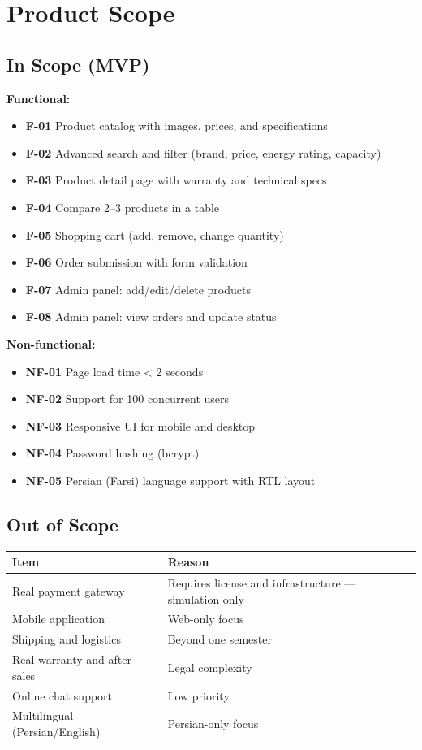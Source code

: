 \documentclass[12pt, a4paper]{article}
\begin{document}
\section{Product Scope}

\subsection{In Scope (MVP)}

\textbf{Functional:}
\begin{itemize}
    \item \textbf{F-01} Product catalog with images, prices, and specifications
    \item \textbf{F-02} Advanced search and filter (brand, price, energy rating, capacity)
    \item \textbf{F-03} Product detail page with warranty and technical specs
    \item \textbf{F-04} Compare 2--3 products in a table
    \item \textbf{F-05} Shopping cart (add, remove, change quantity)
    \item \textbf{F-06} Order submission with form validation
    \item \textbf{F-07} Admin panel: add/edit/delete products
    \item \textbf{F-08} Admin panel: view orders and update status
\end{itemize}

\textbf{Non-functional:}
\begin{itemize}
    \item \textbf{NF-01} Page load time < 2 seconds
    \item \textbf{NF-02} Support for 100 concurrent users
    \item \textbf{NF-03} Responsive UI for mobile and desktop
    \item \textbf{NF-04} Password hashing (bcrypt)
    \item \textbf{NF-05} Persian (Farsi) language support with RTL layout
\end{itemize}

\subsection{Out of Scope}
\begin{center}
\begin{tabular}{|l|p{8cm}|}
\hline
\textbf{Item} & \textbf{Reason} \\
\hline
Real payment gateway & Requires license and infrastructure --- simulation only \\
\hline
Mobile application & Web-only focus \\
\hline
Shipping and logistics & Beyond one semester \\
\hline
Real warranty and after-sales & Legal complexity \\
\hline
Online chat support & Low priority \\
\hline
Multilingual (Persian/English) & Persian-only focus \\
\hline
\end{tabular}
\end{center}
\end{document}
